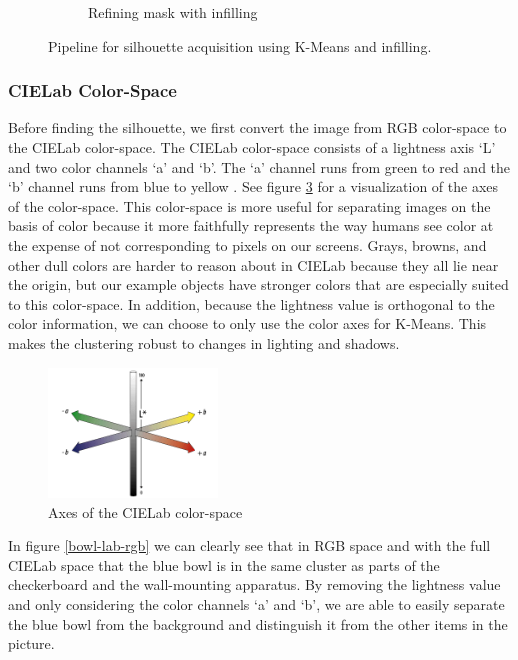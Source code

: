 \documentclass[10pt,twocolumn,letterpaper]{article}
\begin{document}
\begin{figure}[ht]
\begin{subfigure}[t]{0.2\textwidth}
        \caption{Refining mask with infilling}
        \label{bowl-kmeans-infill}
    \end{subfigure}
    \caption{Pipeline for silhouette acquisition using K-Means and infilling.}
    \label{bowl-kmeans}
\end{figure}

\subsubsection{CIELab Color-Space}

Before finding the silhouette, we first convert the image from RGB color-space to the CIELab color-space. The CIELab color-space consists of a lightness axis `L' and two color channels `a' and `b'. The `a' channel runs from green to red and the `b' channel runs from blue to yellow \cite{AdobeCIELAB}. See figure \ref{cielab} for a visualization of the axes of the color-space. This color-space is more useful for separating images on the basis of color because it more faithfully represents the way humans see color at the expense of not corresponding to pixels on our screens. Grays, browns, and other dull colors are harder to reason about in CIELab because they all lie near the origin, but our example objects have stronger colors that are especially suited to this color-space. In addition, because the lightness value is orthogonal to the color information, we can choose to only use the color axes for K-Means. This makes the clustering robust to changes in lighting and shadows.

\begin{figure}[H]
    \centering
    \includegraphics[width=0.4\textwidth]{CIELAB.png}
    \caption{Axes of the CIELab color-space \cite{AdobeCIELAB}}
    \label{cielab}
\end{figure}

In figure \ref{bowl-lab-rgb} we can clearly see that in RGB space and with the full CIELab space that the blue bowl is in the same cluster as parts of the checkerboard and the wall-mounting apparatus. By removing the lightness value and only considering the color channels `a' and `b', we are able to easily separate the blue bowl from the background and distinguish it from the other items in the picture.
\end{document}
